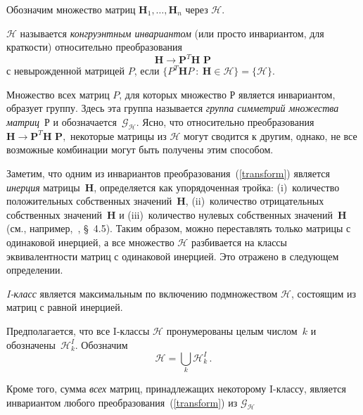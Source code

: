 Обозначим множество матриц $\textbf{H}_1,\dots,\textbf{H}_n$ через ${\mathcal{H}}$.

\begin{definition} \label{def:invariance}
${\mathcal H}$ называется {\em конгруэнтным инвариантом} (или просто инвариантом, для краткости) относительно преобразования
%
\begin{equation}
\label{transform}
\textbf{H} \to \textbf{P}^T \textbf{H P} \,
\end{equation}
%
с невырожденной матрицей $P$, если $\{P^T \textbf{H} P \ : \ \textbf{H} \in {\mathcal H}\}= \{\mathcal H\}$.
\end{definition}

Множество всех матриц $P$, для которых множество ${\mathcal{Р}}$ является инвариантом, образует группу. Здесь эта группа называется {\em группа симметрий множества матриц}~${\mathcal{Р}}$ и обозначается~${\mathcal{G}}_{\mathcal{H}}$. Ясно, что относительно преобразования $\textbf{H} \to \textbf{P}^T \textbf{H P},$ некоторые матрицы из $\mathcal{H}$ могут сводится к другим, однако, не все возможные комбинации могут быть получены этим способом.

Заметим, что одним из инвариантов преобразования~(\ref{transform}) является {\em инерция} матрицы~$\textbf{H}$,
определяется как упорядоченная тройка: (i)~количество положительных собственных значений~$\textbf{H}$, (ii)~количество отрицательных собственных значений~$\textbf{H}$ и (iii)~количество нулевых собственных значений~$\textbf{H}$ (см., например,~\cite{horn:matrix}, \S~4.5). Таким образом, можно переставлять только матрицы с одинаковой инерцией, а все множество ${\mathcal{H}}$ разбивается на классы эквивалентности матриц с одинаковой инерцией. Это отражено в следующем определении.
\begin{definition}
{\em I-класс} является максимальным по включению подмножеством ${\mathcal{H}}$, состоящим из матриц с равной инерцией.
\end{definition}

Предполагается, что все I-классы ${\mathcal{H}}$ пронумерованы целым числом~$k$ и обозначены~${\mathcal{H}}^I_k$. Обозначим
%
\begin{equation}
{\mathcal{H}} = \bigcup_k {\mathcal{H}}^I_k \, .
\end{equation}
%

Кроме того, сумма \textit{всех} матриц, принадлежащих некоторому I-классу, является инвариантом любого преобразования~(\ref{transform}) из ${\mathcal{G}}_{\mathcal{H}} $

